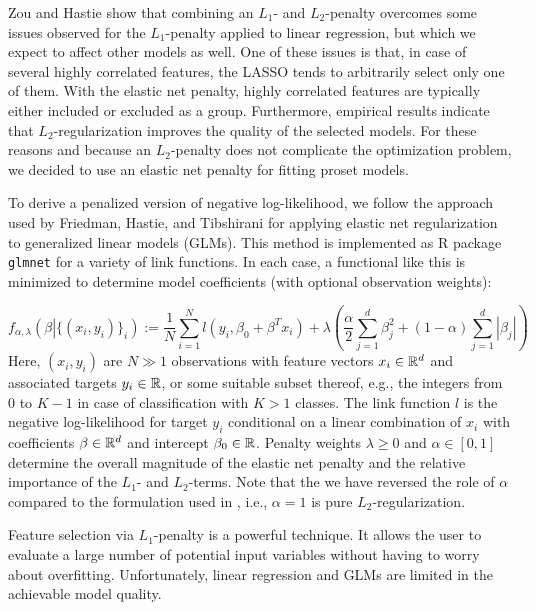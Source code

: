 %
Zou and Hastie \cite{Zou_05} show that combining an $L_1$- and $L_2$-penalty overcomes some issues observed for the $L_1$-penalty applied to linear regression, but which we expect to affect other models as well.
One of these issues is that, in case of several highly correlated features, the LASSO tends to arbitrarily select only one of them.
With the elastic net penalty, highly correlated features are typically either included or excluded as a group.
Furthermore, empirical results indicate that $L_2$-regularization improves the quality of the selected models.
For these reasons and because an $L_2$-penalty does not complicate the optimization problem, we decided to use an elastic net penalty for fitting proset models.\par
%
To derive a penalized version of negative log-likelihood, we follow the approach used by Friedman, Hastie, and Tibshirani \cite{Friedman_10} for applying elastic net regularization to generalized linear models (GLMs).
This method is implemented as R package \texttt{glmnet} \cite{Friedman_10} for a variety of link functions.
In each case, a functional like this is minimized to determine model coefficients (with optional observation weights):\par
%
\begin{equation}
f_{\alpha,\lambda}\left(\beta\left|\{(x_i,y_i)\}_i\right.\right):=\frac{1}{N}\sum_{i=1}^Nl(y_i,\beta_0+\beta^Tx_i)+\lambda\left(\frac{\alpha}{2}\sum_{j=1}^d\beta_j^2+(1-\alpha)\sum_{j=1}^d|\beta_j|\right)\label{eq_regularization}
\end{equation}
%
Here, $(x_i,y_i)$ are $N\gg1$ observations with feature vectors $x_i\in\mathbb{R}^d$ and associated targets $y_i\in\mathbb{R}$, or some suitable subset thereof, e.g., the integers from $0$ to $K-1$ in case of classification with $K>1$ classes.
The link function $l$ is the negative log-likelihood for target $y_i$ conditional on a linear combination of $x_i$ with coefficients $\beta\in\mathbb{R}^d$ and intercept $\beta_0\in\mathbb{R}$.
Penalty weights $\lambda\geq0$ and $\alpha\in[0,1]$ determine the overall magnitude of the elastic net penalty and the relative importance of the $L_1$- and $L_2$-terms.
Note that the we have reversed the role of $\alpha$ compared to the formulation used in \cite{Friedman_10}, i.e., $\alpha=1$ is pure $L_2$-regularization.\par
%
Feature selection via $L_1$-penalty is a powerful technique.
It allows the user to evaluate a large number of potential input variables without having to worry about overfitting.
Unfortunately, linear regression and GLMs are limited in the achievable model quality.
